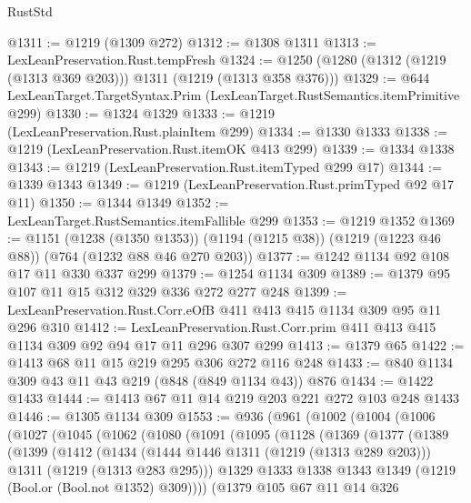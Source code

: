 \begin{lexlean}{RustStd}
\begin{coremodule}
@1311 := @1219 (@1309 @272)
@1312 := @1308 @1311
@1313 := LexLeanPreservation.Rust.tempFresh
@1324 := @1250 (@1280 (@1312 (@1219 (@1313 @369 @203))) @1311 (@1219 (@1313 @358 @376)))
@1329 := @644 LexLeanTarget.TargetSyntax.Prim (LexLeanTarget.RustSemantics.itemPrimitive @299)
@1330 := @1324 @1329
@1333 := @1219 (LexLeanPreservation.Rust.plainItem @299)
@1334 := @1330 @1333
@1338 := @1219 (LexLeanPreservation.Rust.itemOK @413 @299)
@1339 := @1334 @1338
@1343 := @1219 (LexLeanPreservation.Rust.itemTyped @299 @17)
@1344 := @1339 @1343
@1349 := @1219 (LexLeanPreservation.Rust.primTyped @92 @17 @11)
@1350 := @1344 @1349
@1352 := LexLeanTarget.RustSemantics.itemFallible @299
@1353 := @1219 @1352
@1369 := @1151
    (@1238 (@1350 @1353))
    (@1194 (@1215 @38))
    (@1219 (@1223 @46 @88))
    (@764 (@1232 @88 @46 @270 @203))
@1377 := @1242 @1134 @92 @108 @17 @11 @330 @337 @299
@1379 := @1254 @1134 @309
@1389 := @1379 @95 @107 @11 @15 @312 @329 @336 @272 @277 @248
@1399 := LexLeanPreservation.Rust.Corr.eOfB @411 @413 @415 @1134 @309 @95 @11 @296 @310
@1412 := LexLeanPreservation.Rust.Corr.prim @411 @413 @415 @1134 @309 @92 @94 @17 @11 @296 @307 @299
@1413 := @1379 @65
@1422 := @1413 @68 @11 @15 @219 @295 @306 @272 @116 @248
@1433 := @840 @1134 @309 @43 @11 @43 @219 (@848 (@849 @1134 @43)) @876
@1434 := @1422 @1433
@1444 := @1413 @67 @11 @14 @219 @203 @221 @272 @103 @248 @1433
@1446 := @1305 @1134 @309
@1553 := @936
    (@961
      (@1002
        (@1004
          (@1006
            (@1027
              (@1045
                (@1062
                  (@1080
                    (@1091
                      (@1095
                        (@1128
                          (@1369
                            (@1377
                              (@1389
                                (@1399
                                  (@1412
                                    (@1434
                                      (@1444 @1446 @1311 (@1219 (@1313 @289 @203)))
                                      @1311
                                      (@1219 (@1313 @283 @295)))
                                    @1329
                                    @1333
                                    @1338
                                    @1343
                                    @1349
                                    (@1219 (Bool.or (Bool.not @1352) @309))))
                                (@1379
                                  @105
                                  @67
                                  @11
                                  @14
                                  @326

\end{coremodule}
\end{lexlean}
